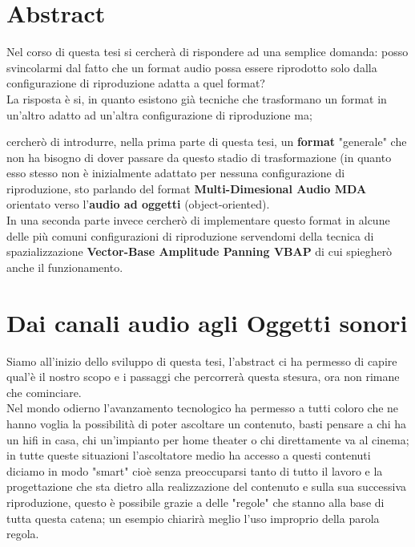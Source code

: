 \documentclass[12pt,a4paper]{report}
\begin{document}
\tableofcontents

\listoffigures



\chapter*{Abstract}

Nel corso di questa tesi si cercherà di rispondere ad una semplice domanda: posso svincolarmi dal fatto che un format audio possa essere riprodotto solo dalla configurazione di riproduzione adatta a quel format?\\

La risposta è si, in quanto esistono già tecniche che trasformano un format in un'altro adatto ad un'altra configurazione di riproduzione ma; 

 cercherò di introdurre, nella prima parte di questa tesi, un \textbf{format} "generale" che non ha bisogno di dover passare da questo stadio di trasformazione (in quanto esso stesso non è inizialmente adattato per nessuna configurazione di riproduzione, sto parlando del format \textbf{Multi-Dimesional Audio MDA} orientato verso l'\textbf{audio ad oggetti} (object-oriented).\\

In una seconda parte invece cercherò di implementare questo format in alcune delle più comuni configurazioni di riproduzione servendomi della tecnica di spazializzazione \textbf{Vector-Base Amplitude Panning VBAP} di cui spiegherò anche il funzionamento.



\chapter{Dai canali audio agli Oggetti sonori}

Siamo all'inizio dello sviluppo di questa tesi, l'abstract ci ha permesso di capire qual'è il nostro scopo e i passaggi che percorrerà questa stesura, ora non rimane che cominciare.\\

Nel mondo odierno l'avanzamento tecnologico ha permesso a tutti coloro che ne hanno voglia la possibilità di poter ascoltare un contenuto, basti pensare a chi ha un hifi in casa, chi un'impianto per home theater o chi direttamente va al cinema; in tutte queste situazioni l'ascoltatore medio ha accesso a questi contenuti diciamo in modo "smart" cioè senza preoccuparsi tanto di tutto il lavoro e la progettazione che sta dietro alla realizzazione del contenuto e sulla sua successiva riproduzione, questo è possibile grazie a delle "regole" che stanno alla base di tutta questa catena; un esempio chiarirà meglio l'uso improprio della parola regola.\\
\end{document}

